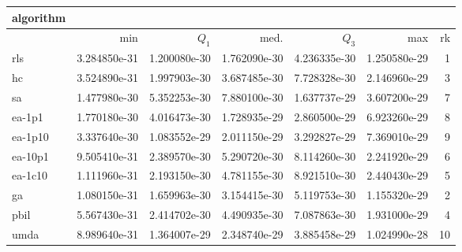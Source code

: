 \begin{tabular}{@{}l*{5}{>{{}}N{1}{1}}>{{}}N{2}{0}@{}}
\toprule
{algorithm} &  \\
\midrule
& {min} & {$Q_1$} & {med.} & {$Q_3$} & {max} & {rk}\\
\midrule
rls & 3.284850e-31 & {\color{blue}} 1.200080e-30 & {\color{blue}} 1.762090e-30 & {\color{blue}} 4.236335e-30 & 1.250580e-29 & 1\\
hc & 3.524890e-31 & 1.997903e-30 & 3.687485e-30 & 7.728328e-30 & 2.146960e-29 & 3\\
sa & 1.477980e-30 & 5.352253e-30 & 7.880100e-30 & 1.637737e-29 & 3.607200e-29 & 7\\
ea-1p1 & 1.770180e-30 & 4.016473e-30 & 1.728935e-29 & 2.860500e-29 & 6.923260e-29 & 8\\
ea-1p10 & 3.337640e-30 & 1.083552e-29 & 2.011150e-29 & 3.292827e-29 & 7.369010e-29 & 9\\
ea-10p1 & 9.505410e-31 & 2.389570e-30 & 5.290720e-30 & 8.114260e-30 & 2.241920e-29 & 6\\
ea-1c10 & 1.111960e-31 & 2.193150e-30 & 4.781155e-30 & 8.921510e-30 & 2.440430e-29 & 5\\
ga & {\color{blue}} 1.080150e-31 & 1.659963e-30 & 3.154415e-30 & 5.119753e-30 & {\color{blue}} 1.155320e-29 & 2\\
pbil & 5.567430e-31 & 2.414702e-30 & 4.490935e-30 & 7.087863e-30 & 1.931000e-29 & 4\\
umda & 8.989640e-31 & 1.364007e-29 & 2.348740e-29 & 3.885458e-29 & 1.024990e-28 & 10\\
\bottomrule
\end{tabular}
